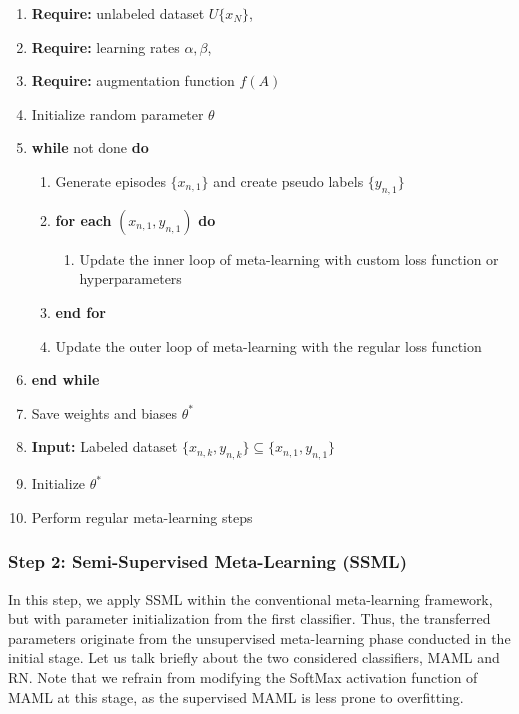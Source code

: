 \begin{algorithm}[htbp]
    \caption{MetaRep}
    \label{alg:1}
    \begin{enumerate}
        \item \textbf{Require:} unlabeled dataset $U\{x_N\}$, 
        \item \textbf{Require:} learning rates $\alpha, \beta$, 
        \item \textbf{Require:} augmentation function $f(A)$
        \item Initialize random parameter $\theta$
        \item \textbf{while} not done \textbf{do}
        \begin{enumerate}
            \item Generate episodes $\{x_{n,1}\}$ and create pseudo labels $\{y_{n,1}\}$
            \item \textbf{for each} $(x_{n,1}, y_{n,1})$ \textbf{do}
            \begin{enumerate}
                \item Update the inner loop of meta-learning with custom loss function or hyperparameters
            \end{enumerate}
            \item \textbf{end for}
            \item Update the outer loop of meta-learning with the regular loss function
        \end{enumerate}
        \item \textbf{end while}
        \item Save weights and biases $\theta^*$
        \item \textbf{Input:} Labeled dataset $\{x_{n,k}, y_{n,k}\} \subseteq \{x_{n,1}, y_{n,1}\}$
        \item Initialize $\theta^*$
        \item Perform regular meta-learning steps
    \end{enumerate}
\end{algorithm}

\subsubsection{Step 2: Semi-Supervised Meta-Learning (SSML)}

In this step, we apply SSML within the conventional meta-learning framework, but with parameter initialization from the first classifier. Thus, the transferred parameters originate from the unsupervised meta-learning phase conducted in the initial stage. Let us talk briefly about the two considered classifiers, MAML and RN. Note that we refrain from modifying the SoftMax activation function of MAML at this stage, as the supervised MAML is less prone to overfitting.

